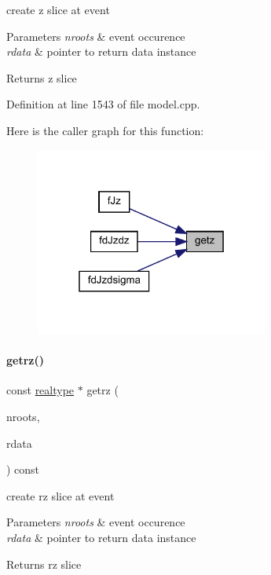 create z slice at event 
\begin{DoxyParams}{Parameters}
{\em nroots} & event occurence \\
\hline
{\em rdata} & pointer to return data instance \\
\hline
\end{DoxyParams}
\begin{DoxyReturn}{Returns}
z slice 
\end{DoxyReturn}


Definition at line 1543 of file model.\+cpp.

Here is the caller graph for this function\+:
\nopagebreak
\begin{figure}[H]
\begin{center}
\leavevmode
\includegraphics[width=217pt]{classamici_1_1_model_a30571e418f94ca61b8df2b355e46ee1a_icgraph}
\end{center}
\end{figure}
\mbox{\label{classamici_1_1_model_ab2a9be3bb641741a52ddc48fcd9aa143}} 
\paragraph{\texorpdfstring{getrz()}{getrz()}}
{\footnotesize\ttfamily const \mbox{\hyperlink{namespaceamici_a1bdce28051d6a53868f7ccbf5f2c14a3}{realtype}} $\ast$ getrz (\begin{DoxyParamCaption}\item[{const int}]{nroots,  }\item[{const \mbox{\hyperlink{classamici_1_1_return_data}{Return\+Data}} $\ast$}]{rdata }\end{DoxyParamCaption}) const\hspace{0.3cm}{\ttfamily [protected]}}

create rz slice at event 
\begin{DoxyParams}{Parameters}
{\em nroots} & event occurence \\
\hline
{\em rdata} & pointer to return data instance \\
\hline
\end{DoxyParams}
\begin{DoxyReturn}{Returns}
rz slice 
\end{DoxyReturn}


